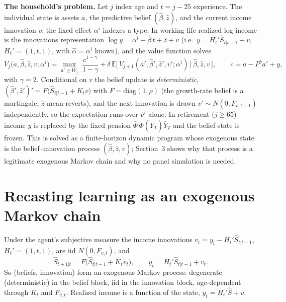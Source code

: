 \documentclass[11pt,fleqn]{article}
\begin{document}
\medskip\noindent\textbf{The household's problem.} Let $j$ index age and $t=j-25$
experience. The individual state is assets $a$, the predictive belief
$(\hat\beta,\hat z)$, and the current income innovation $v$; the fixed effect $\alpha^i$
indexes a type. In working life realized log income is the innovations representation
$\log y = \alpha^i + \hat\beta\,t + \hat z + v$ (i.e.\ $y=H_t'\hat S_{t|t-1}+v$,
$H_t'=(1,t,1)$, with $\hat\alpha=\alpha^i$ known), and the value function solves
\begin{equation}
V_j\big(a,\hat\beta,\hat z,v;\alpha^i\big)=\max_{a'\ge \bar{W}_j}\;
\frac{c^{1-\gamma}}{1-\gamma}
+\delta\,\mathbb{E}\big[\,V_{j+1}(a',\hat\beta',\hat z',v';\alpha^i)\,\big|\,\hat\beta,\hat z,v\,\big],
\qquad c=a-P^b a'+y,
\end{equation}
with $\gamma=2$. Conditional on $v$ the belief update is \emph{deterministic},
$(\hat\beta',\hat z')' = F\big(\hat S_{t|t-1}+K_t v\big)$ with $F=\mathrm{diag}(1,\rho)$
(the growth-rate belief is a martingale, $\hat z$ mean-reverts), and the next innovation
is drawn $v'\sim N(0,F_{v,t+1})$ independently, so the expectation runs over $v'$ alone.
In retirement ($j\ge 65$) income $y$ is replaced by the fixed pension
$\bar\Phi\,\Phi(\tilde Y_T)\bar Y_T$ and the belief state is frozen. This is solved as a
finite-horizon dynamic program whose exogenous state is the belief--innovation process
$(\hat\beta,\hat z,v)$; Section~3 shows why that process is a legitimate exogenous Markov
chain and why no panel simulation is needed.

\section{Recasting learning as an exogenous Markov chain}

Under the agent's subjective measure the income innovations
$v_t = y_t - H_t'\hat{S}_{t|t-1}$, $H_t'=(1,t,1)$, are iid $N(0,F_{v,t})$, and
\begin{equation}
  \hat{S}_{t+1|t} = F\big(\hat{S}_{t|t-1} + K_t v_t\big), \qquad
  y_t = H_t'\hat{S}_{t|t-1} + v_t .
\end{equation}
So (beliefs, innovation) form an exogenous Markov process: degenerate (deterministic)
in the belief block, iid in the innovation block, age-dependent through $K_t$ and
$F_{v,t}$. Realized income is a function of the state, $y_t=H_t'\hat{S}+v$.
\end{document}
